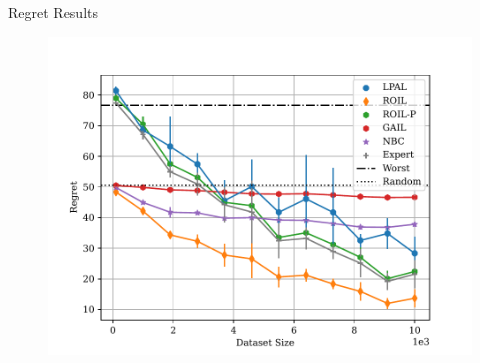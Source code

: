\documentclass[final,a0paper]{beamer}
\begin{document}
\begin{frame}{}
\begin{columns}[t]
\begin{column}{0.3\linewidth}
\begin{block}{Regret Results}
        \begin{center}
            \begin{figure}
                \includegraphics[]{../../pres_roil/plots/regrets/40x40_gridworld_on_policy_regret_regrets.pdf}
            \end{figure}
        \end{center}
    \end{block}
  \end{column}
\end{columns}
\end{frame}
\end{document}
